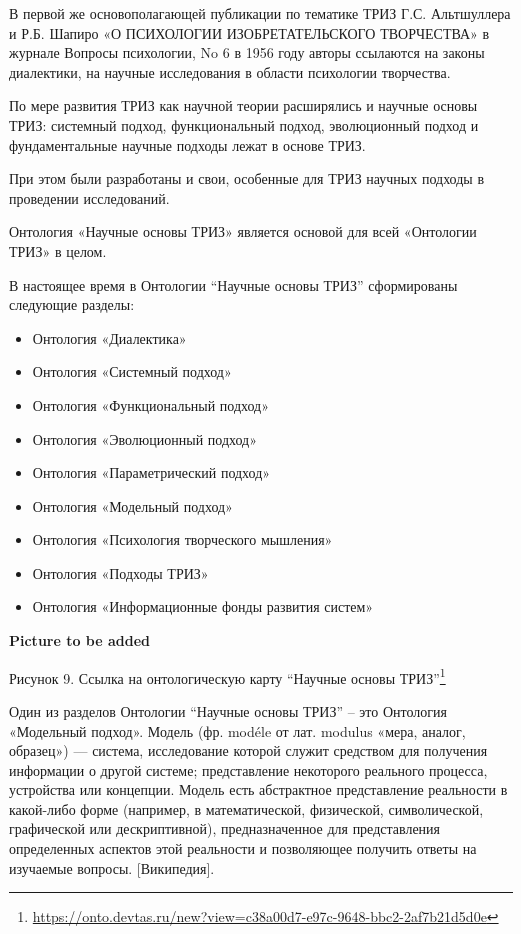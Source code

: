 \documentclass[11pt,a4paper]{article}
\newcommand{\addpicture}{\textbf{Picture to be added}\par}
\begin{document}
В первой же основополагающей публикации по тематике ТРИЗ Г.С. Альтшуллера и
Р.Б. Шапиро «О ПСИХОЛОГИИ ИЗОБРЕТАТЕЛЬСКОГО ТВОРЧЕСТВА» в журнале Вопросы
психологии, No 6 в 1956 году авторы ссылаются на законы диалектики, на научные
исследования в области психологии творчества.

По мере развития ТРИЗ как научной теории расширялись и научные основы ТРИЗ:
системный подход, функциональный подход, эволюционный подход и фундаментальные
научные подходы лежат в основе ТРИЗ.

При этом были разработаны и свои, особенные для ТРИЗ научных подходы в
проведении исследований.

Онтология «Научные основы ТРИЗ» является основой для всей «Онтологии ТРИЗ» в
целом.

В настоящее время в Онтологии “Научные основы ТРИЗ” сформированы следующие
разделы:
\begin{itemize}[noitemsep]
\item Онтология «Диалектика»
\item Онтология «Системный подход»
\item Онтология «Функциональный подход»
\item Онтология «Эволюционный подход»
\item Онтология «Параметрический подход»
\item Онтология «Модельный подход»
\item Онтология «Психология творческого мышления»
\item Онтология «Подходы ТРИЗ»
\item Онтология «Информационные фонды развития систем»
\end{itemize}

\begin{center}
  \addpicture
  Рисунок 9. Ссылка на онтологическую карту “Научные основы
  ТРИЗ”\footnote{\url{https://onto.devtas.ru/new?view=c38a00d7-e97c-9648-bbc2-2af7b21d5d0e}} 
\end{center}

Один из разделов Онтологии “Научные основы ТРИЗ” -- это Онтология «Модельный
подход».  Модель (фр. mod\'ele от лат. modulus «мера, аналог, образец») —
система, исследование которой служит средством для получения информации о
другой системе; представление некоторого реального процесса, устройства или
концепции.  Модель есть абстрактное представление реальности в какой-либо
форме (например, в математической, физической, символической, графической или
дескриптивной), предназначенное для представления определенных аспектов этой
реальности и позволяющее получить ответы на изучаемые вопросы. [Википедия].
\end{document}
